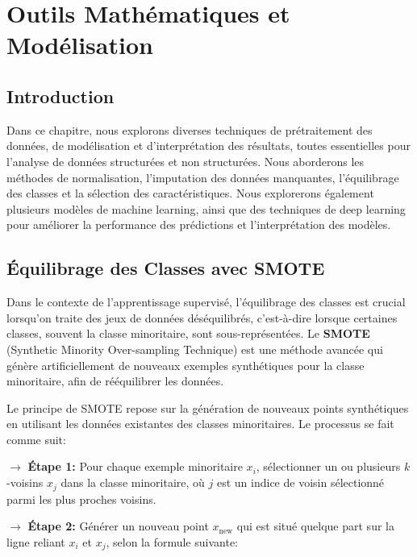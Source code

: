 \chapter{Outils Mathématiques et Modélisation}
\begin{spacing}{1.2}
\minitoc
\thispagestyle{MyStyle}
\end{spacing}
\newpage
\justifying


\section{Introduction}

Dans ce chapitre, nous explorons diverses techniques de prétraitement des données, de modélisation et d’interprétation des résultats, toutes essentielles pour l’analyse de données structurées et non structurées. Nous aborderons les méthodes de normalisation, l’imputation des données manquantes, l’équilibrage des classes et la sélection des caractéristiques. Nous explorerons également plusieurs modèles de machine learning, ainsi que des techniques de deep learning pour améliorer la performance des prédictions et l’interprétation des modèles.

\section{Équilibrage des Classes avec SMOTE}

Dans le contexte de l'apprentissage supervisé, l'équilibrage des classes est crucial lorsqu'on traite des jeux de données déséquilibrés, c'est-à-dire lorsque certaines classes, souvent la classe minoritaire, sont sous-représentées. Le \textbf{SMOTE} (Synthetic Minority Over-sampling Technique) est une méthode avancée qui génère artificiellement de nouveaux exemples synthétiques pour la classe minoritaire, afin de rééquilibrer les données.

Le principe de SMOTE repose sur la génération de nouveaux points synthétiques en utilisant les données existantes des classes minoritaires. Le processus se fait comme suit:

\textbf{\(\rightarrow\)} \textbf{Étape 1:} Pour chaque exemple minoritaire \(x_i\), sélectionner un ou plusieurs \(k\)-voisins \(x_j\) dans la classe minoritaire, où \(j\) est un indice de voisin sélectionné parmi les plus proches voisins.
    
\textbf{\(\rightarrow\)} \textbf{Étape 2:} Générer un nouveau point \(x_{\text{new}}\) qui est situé quelque part sur la ligne reliant \(x_i\) et \(x_j\), selon la formule suivante:
    
